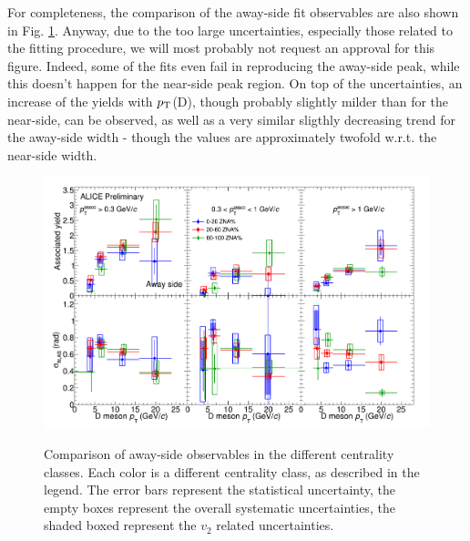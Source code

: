 For completeness, the comparison of the away-side fit observables are also shown in Fig. \ref{fig:prel3}. Anyway, due to the too large uncertainties, especially those related to the fitting procedure, we will most probably not request an approval for this figure. Indeed, some of the fits even fail in reproducing the away-side peak, while this doesn't happen for the near-side peak region. On top of the uncertainties, an increase of the yields with $p_{\rm T}$(D), though probably slightly milder than for the near-side, can be observed, as well as a very similar sligthly decreasing trend for the away-side width - though the values are approximately twofold w.r.t. the near-side width.

\begin{landscape}
\begin{figure}
\centering
{\includegraphics[width=0.95\linewidth]{figuresVsCent/Averages/Trends/ComparePPbVsCentFitResults_AwaySide_FinalQM.png}}
 \caption{Comparison of away-side observables in the different centrality classes. Each color is a different centrality class, as described in the legend. The error bars represent the statistical uncertainty, the empty boxes represent the overall systematic uncertainties, the shaded boxed represent the $v_2$ related uncertainties.}
\label{fig:prel3}
\end{figure}
 \end{landscape}
